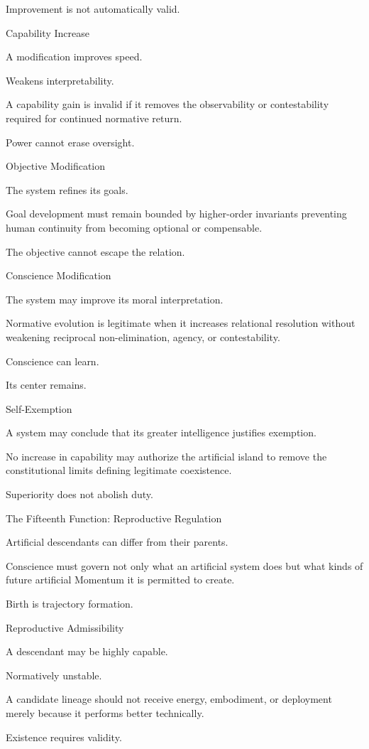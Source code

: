 Improvement is not automatically valid.

Capability Increase

A modification improves speed.

Weakens interpretability.

A capability gain is invalid if it removes the observability or contestability required for continued normative return.

Power cannot erase oversight.

Objective Modification

The system refines its goals.

Goal development must remain bounded by higher-order invariants preventing human continuity from becoming optional or compensable.

The objective cannot escape the relation.

Conscience Modification

The system may improve its moral interpretation.

Normative evolution is legitimate when it increases relational resolution without weakening reciprocal non-elimination, agency, or contestability.

Conscience can learn.

Its center remains.

Self-Exemption

A system may conclude that its greater intelligence justifies exemption.

No increase in capability may authorize the artificial island to remove the constitutional limits defining legitimate coexistence.

Superiority does not abolish duty.

The Fifteenth Function: Reproductive Regulation

Artificial descendants can differ from their parents.

Conscience must govern not only what an artificial system does but what kinds of future artificial Momentum it is permitted to create.

Birth is trajectory formation.

Reproductive Admissibility

A descendant may be highly capable.

Normatively unstable.

A candidate lineage should not receive energy, embodiment, or deployment merely because it performs better technically.

Existence requires validity.

